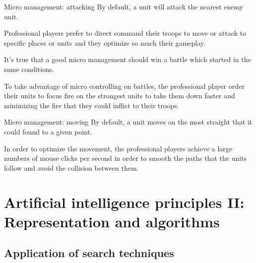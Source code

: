 \documentclass[10pt]{beamer}
\begin{document}
\begin{frame}{Micro management: attacking}
 By default, a unit will attack the nearest enemy unit.
\newline

  Professional players prefer to direct command their troops to move or attack to specific places or units and they optimize so much their gameplay.
\newline

It's true that a good micro management should win a battle which started in the same conditions.
\newline

    To take advantage of micro controlling on battles, the professional player order their units to focus fire on the strongest units to take them down faster and minimizing the fire that they could inflict to their troops.

\end{frame}

\begin{frame}{Micro management: moving}
  By default, a unit moves on the most straight that it could found to a given point.
\newline

  In order to optimize the movement, the professional players achieve a large numbers of mouse clicks per second in order to smooth the paths that the units follow and avoid the collision between them. 
\end{frame}

\section{Artificial intelligence principles II: Representation and algorithms}

	    \subsection{Application of search techniques}
    
\end{document}
